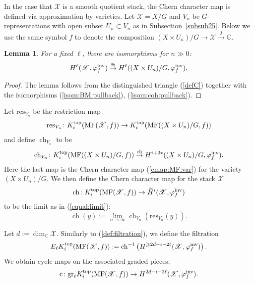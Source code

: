 \documentclass [11pt,oneside,a4paper,mathscr]{amsart}
\newtheorem{lemma}[thm]{Lemma}
\theoremstyle{definition}
\renewcommand{\geq}{\geqslant}
\newcommand{\X}{\mathscr{X}}
\newcommand{\ch}{\operatorname{ch}}
\begin{document}
  In the case that $\X$ is a smooth quotient stack, the Chern character map 
is defined via approximation by varieties. 
Let $\X=X/G$ and $V_n$ be $G$-representations with open subset 
$U_n \subset V_n$ 
as in Subsection~\ref{subsub25}. 
Below we use the same symbol $f$ to denote the 
composition $(X\times U_n)/G \to \X \stackrel{f}{\to} \mathbb{C}$. 

\begin{lemma}\label{lem:Hl}
For a fixed $\ell$, there are isomorphisms for $n\gg 0$: 
\begin{align*}
    H^{\ell}(\X, \varphi_f^{\rm{inv}}) \stackrel{\cong}{\to} H^{\ell}((X\times U_n)/G, \varphi_f^{\rm{inv}}). 
\end{align*}
\end{lemma}
\begin{proof}
    The lemma follows from the distinguished triangle (\ref{defC})
    together with the isomorphisms (\ref{isom:BM:pullback}), (\ref{isom:coh:pullback}). 
\end{proof}
Let $\mathrm{res}_{V_n}$ be the restriction map 
\begin{align*}
    \mathrm{res}_{V_n} \colon K_i^{\rm{top}}(\mathrm{MF}(\X, f))
    \to K_i^{\rm{top}}(\mathrm{MF}((X\times U_n)/G, f))
\end{align*}
and define 
$\ch_{V_n}$ to be 
\begin{align*}
    \ch_{V_n} \colon 
    K_i^{\rm{top}}(\mathrm{MF}((X\times U_n)/G, f)) 
    \stackrel{\ch}{\to} H^{i+2\ast}((X\times U_n)/G, \varphi_f^{\rm{inv}}). 
\end{align*}
Here the last map is the Chern character map (\ref{cmap:MF:var}) for the 
variety $(X\times U_n)/G$. 
We then define the Chern character map for the stack $\X$
\begin{align}\label{cmap:quot}
	\ch \colon K_i^{\rm{top}}(\mathrm{MF}(\X, f)) \to
 	\widetilde{H}^i(\X, \varphi_f^{\rm{inv}})
	\end{align}
 to be the limit as in (\ref{equal:limit}):
 \[\ch(y):= \lim_{n\to \infty} \ch_{V_n}(\mathrm{res}_{V_n}(y)).\] 

Let $d:=\dim_\mathbb{C}\X$.
Similarly to (\ref{def:filtration}), we
define the filtration 
\begin{equation}\label{deffiltrationKsg}
E_\ell K_i^{\rm{top}}(\mathrm{MF}(\X, f)):=\mathrm{ch}^{-1}\left(H^{\geq 2d-i-2\ell}(\X, \varphi^{\mathrm{inv}}_f)\right).
\end{equation}
We obtain cycle maps on the associated graded pieces:
\begin{equation}\label{cycleKsg}
    \mathrm{c}\colon \mathrm{gr}_\ell K_i^{\rm{top}}(\mathrm{MF}(\X, f))\to H^{2d-i-2\ell}(\X, \varphi^{\mathrm{inv}}_f).
\end{equation}
\end{document}
